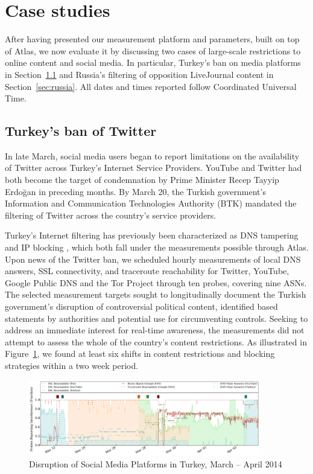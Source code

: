 \section{Case studies}
\label{sec:case_studies}

After having presented our measurement platform and parameters, built on
top of Atlas, we now evaluate it by discussing two cases of large-scale
restrictions to online content and social media.  In particular,
Turkey's ban on media platforms in Section~\ref{sec:turkey} and Russia's
filtering of opposition LiveJournal content in Section~\ref{sec:russia}.
All dates and times reported follow Coordinated Universal Time.


\subsection{Turkey's ban of Twitter}
\label{sec:turkey}

In late March, social media users began to report limitations on the
availability of Twitter across Turkey's Internet Service Providers.
YouTube and Twitter had both become the target of condemnation by Prime
Minister Recep Tayyip Erdo\u{g}an in preceding months. By March 20, the
Turkish government's Information and Communication Technologies
Authority (BTK) mandated the filtering of Twitter across the country's
service providers.

Turkey's Internet filtering has previously been characterized as DNS
tampering and IP blocking \cite{akdeniz2010report}, which both fall
under the measurements possible through Atlas.  Upon news of the Twitter
ban, we scheduled hourly measurements of local DNS answers, SSL
connectivity, and traceroute reachability for Twitter, YouTube, Google
Public DNS and the Tor Project through ten probes, covering nine ASNs. 
The selected measurement targets sought to longitudinally document the
Turkish government's disruption of controversial political content,
identified based statements by authorities and potential use for
circumventing controls. Seeking to address an immediate interest for
real-time awareness, the measurements did not attempt to assess the
whole of the country's content restrictions. As illustrated in
Figure~\ref{image:tr-social_media_filtering}, we found at least six
shifts in content restrictions and blocking strategies within a two week
period.

\begin{figure}
  \centering
  \includegraphics[width=0.9\textwidth]{diagrams/tr-20140321-20140407-social_media_filtering.png}
  \caption{Disruption of Social Media Platforms in Turkey, March -- April 2014}
  \label{image:tr-social_media_filtering}
\end{figure}


